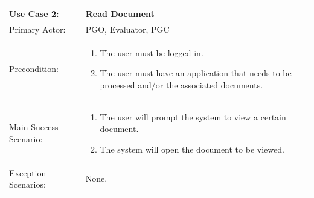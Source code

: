 \documentclass{article}
\begin{document}
\\ \\ \\ \\
\begin{tabular} {| m{5cm} | m{10cm} |}
\hline
Use Case 2: & Read Document \\
\hline
Primary Actor: & PGO, Evaluator, PGC \\
\hline
Precondition: & \begin{enumerate} \itemsep0em \item The user must be logged in. \item The user must have an application that needs to be processed and/or the associated documents. \end{enumerate} \\
\hline
Main Success Scenario: & \begin{enumerate} \itemsep0em \item The user will prompt the system to view a certain document. \item The system will open the document to be viewed. \end{enumerate} \\
\hline
Exception Scenarios: & None. \\
\hline
\end{tabular}
\\ \\ \\ \\
\end{document}
